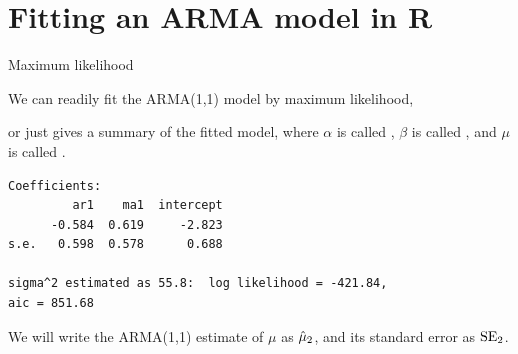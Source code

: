 \section{Fitting an ARMA model in R}

\begin{frame}[fragile]{Maximum likelihood}

We can readily fit the ARMA(1,1) model by maximum likelihood,

\begin{knitrout}\small
{}\color{fgcolor}\begin{kframe}
\begin{alltt}
 \hlkwb{<-} \hlopt{$} \hlstd{=}\hlstd{(}\hlstd{,}\hlstd{,}\hlstd{))}
\end{alltt}
\end{kframe}
\end{knitrout}

 or just  gives a summary of the fitted model, where $\alpha$ is called , $\beta$ is called , and $\mu$ is called .

\begin{knitrout}\small
{}\color{fgcolor}\begin{kframe}
\begin{verbatim}
Coefficients:
         ar1    ma1  intercept
      -0.584  0.619     -2.823
s.e.   0.598  0.578      0.688

sigma^2 estimated as 55.8:  log likelihood = -421.84,  
aic = 851.68
\end{verbatim}
\end{kframe}
\end{knitrout}

We will write the ARMA(1,1) estimate of $\mu$ as $\hat\mu_2$, and its standard error as $\mathrm{SE}_2$.

\end{frame}

